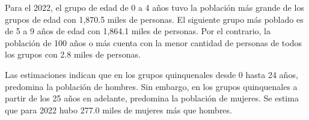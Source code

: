 Para el 2022, el grupo de edad de 0 a 4 años tuvo la población más grande de los grupos de edad con 1,870.5 miles de personas. El siguiente grupo más poblado es de 5 a 9 años de edad con 1,864.1 miles de personas. Por el contrario,  la población de 100 años o más cuenta con la menor cantidad de personas de todos los grupos con 2.8 miles de personas. 

Las estimaciones indican que en los grupos quinquenales desde 0 hasta 24 años, predomina la población de hombres. Sin embargo, en los grupos quinquenales a partir de los 25 años en adelante, predomina la población de mujeres. Se estima que para 2022 hubo 277.0 miles de mujeres más que hombres.